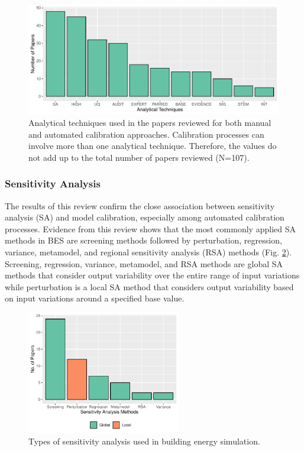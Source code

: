 \documentclass[review]{elsarticle}
\begin{document}
\begin{figure}[!h]
\centering
\includegraphics[width=\textwidth]{figures/analytical.pdf}
\caption{Analytical techniques used in the papers reviewed for both manual and automated calibration approaches. Calibration processes can involve more than one analytical technique. Therefore, the values do not add up to the total number of papers reviewed (N=107).}
\label{fig:analytical}
\end{figure}

\subsubsection{Sensitivity Analysis}

The results of this review confirm the close association between sensitivity analysis (SA) and model calibration, especially among automated calibration processes. Evidence from this review shows that the most commonly applied SA methods in BES are screening methods followed by perturbation, regression, variance, metamodel, and regional sensitivity analysis (RSA) methods (Fig. \ref{fig:sa}). Screening, regression, variance, metamodel, and RSA methods are global SA methods that consider output variability over the entire range of input variations while perturbation is a local SA method that considers output variability based on input variations around a specified base value. 

\begin{figure}[h!]
\centering
\includegraphics[width=0.6\textwidth]{figures/sa.pdf}
\caption{Types of sensitivity analysis used in building energy simulation.}
\label{fig:sa}
\end{figure}
\end{document}
